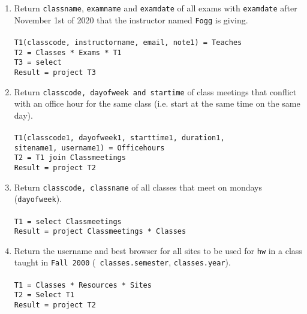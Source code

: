 \documentclass[11pt]{article}
\begin{document}
\begin{enumerate} [label=\Alph*]
\item Return {\tt classname}, {\tt examname} and {\tt examdate} of
  all exams with {\tt examdate} after November 1st of 2020 that the
  instructor named {\tt Fogg} is giving. \\\\
 \texttt{T1(classcode, instructorname, email, note1) = Teaches} \\ 
 \texttt{T2 = Classes * Exams * T1} \\
 \texttt{T3 = select} \\
 \texttt{Result = project T3}

\item Return {\tt classcode, dayofweek and startime} of class meetings
  that conflict with an office hour for the same class (i.e. start at
  the same time on the same day). \\\\
 \texttt{T1(classcode1, dayofweek1, starttime1, duration1, \\ sitename1, username1) = Officehours} \\
 \texttt{T2 = T1 join Classmeetings} \\
 \texttt{Result = project T2}

\item Return {\tt classcode, classname} of all classes that meet on
  mondays ({\tt dayofweek}). \\\\
 \texttt{T1 = select Classmeetings} \\
 \texttt{Result = project Classmeetings * Classes}

\item Return the username and best browser for all sites to be used
  for {\tt hw} in a class taught in {\tt Fall 2000} ({\tt
    classes.semester}, {\tt classes.year}). \\\\
\texttt{T1 = Classes * Resources * Sites} \\
\texttt{T2 = Select T1} \\
\texttt{Result = project T2}


\end{enumerate}
\end{document}

